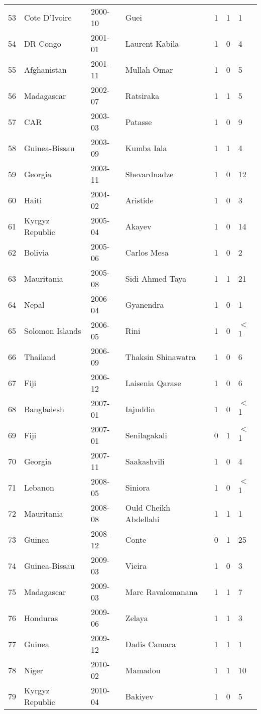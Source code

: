 \begin{table}[ht]
\begin{tabular}{rlllrrl}
  53 & Cote D'Ivoire & 2000-10 & Guei & 1 & 1 & 1 \\ 
  54 & DR Congo & 2001-01 & Laurent Kabila & 1 & 0 & 4 \\ 
  55 & Afghanistan & 2001-11 & Mullah Omar & 1 & 0 & 5 \\ 
  56 & Madagascar & 2002-07 & Ratsiraka & 1 & 1 & 5 \\ 
  57 & CAR & 2003-03 & Patasse & 1 & 0 & 9 \\ 
  58 & Guinea-Bissau & 2003-09 & Kumba Iala & 1 & 1 & 4 \\ 
  59 & Georgia & 2003-11 & Shevardnadze & 1 & 0 & 12 \\ 
  60 & Haiti & 2004-02 & Aristide & 1 & 0 & 3 \\ 
  61 & Kyrgyz Republic & 2005-04 & Akayev & 1 & 0 & 14 \\ 
  62 & Bolivia & 2005-06 & Carlos Mesa & 1 & 0 & 2 \\ 
  63 & Mauritania & 2005-08 & Sidi Ahmed Taya & 1 & 1 & 21 \\ 
  64 & Nepal & 2006-04 & Gyanendra & 1 & 0 & 1 \\ 
  65 & Solomon Islands & 2006-05 & Rini & 1 & 0 & $<$1 \\ 
  66 & Thailand & 2006-09 & Thaksin Shinawatra & 1 & 0 & 6 \\ 
  67 & Fiji & 2006-12 & Laisenia Qarase & 1 & 0 & 6 \\ 
  68 & Bangladesh & 2007-01 & Iajuddin & 1 & 0 & $<$1 \\ 
  69 & Fiji & 2007-01 & Senilagakali & 0 & 1 & $<$1 \\ 
  70 & Georgia & 2007-11 & Saakashvili & 1 & 0 & 4 \\ 
  71 & Lebanon & 2008-05 & Siniora & 1 & 0 & $<$1 \\ 
  72 & Mauritania & 2008-08 & Ould Cheikh Abdellahi & 1 & 1 & 1 \\ 
  73 & Guinea & 2008-12 & Conte & 0 & 1 & 25 \\ 
  74 & Guinea-Bissau & 2009-03 & Vieira & 1 & 0 & 3 \\ 
  75 & Madagascar & 2009-03 & Marc Ravalomanana & 1 & 1 & 7 \\ 
  76 & Honduras & 2009-06 & Zelaya & 1 & 1 & 3 \\ 
  77 & Guinea & 2009-12 & Dadis Camara & 1 & 1 & 1 \\ 
  78 & Niger & 2010-02 & Mamadou & 1 & 1 & 10 \\ 
  79 & Kyrgyz Republic & 2010-04 & Bakiyev & 1 & 0 & 5 \\ 

\end{tabular}
\end{table}
